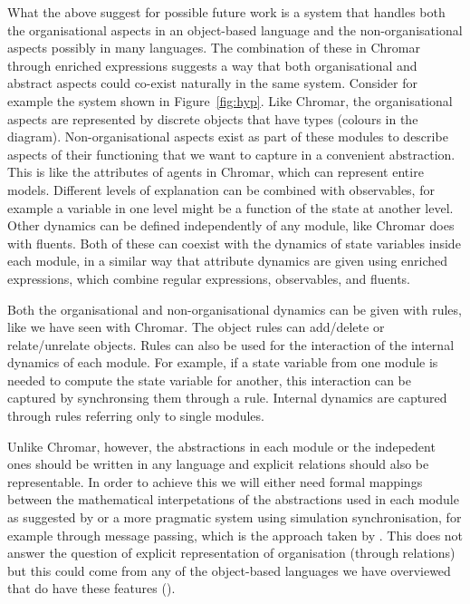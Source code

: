 What the above suggest for possible future work is a system that handles both
the organisational aspects in an object-based language and the
non-organisational aspects possibly in many languages. The combination of these
in Chromar through enriched expressions suggests a way that both organisational
and abstract aspects could co-exist naturally in the same system. Consider for
example the system shown in Figure~\ref{fig:hyp}. Like Chromar, the
organisational aspects are represented by discrete objects that have types
(colours in the diagram). Non-organisational aspects exist as part of these
modules to describe aspects of their functioning that we want to capture in a
convenient abstraction. This is like the attributes of agents in Chromar, which
can represent entire models. Different levels of explanation can be combined
with observables, for example a variable in one level might be a function of the
state at another level. Other dynamics can be defined independently of any module,
like Chromar does with fluents. Both of these can coexist with the dynamics of
state variables inside each module, in a similar way that attribute dynamics are
given using enriched expressions, which combine regular expressions,
observables, and fluents.

Both the organisational and non-organisational dynamics can be given with rules,
like we have seen with Chromar. The object rules can add/delete or
relate/unrelate objects. Rules can also be used for the interaction of the
internal dynamics of each module. For example, if a state variable from one
module is needed to compute the state variable for another, this interaction can
be captured by synchronsing them through a rule. Internal dynamics are captured
through rules referring only to single modules.

Unlike Chromar, however, the abstractions in each module or the indepedent ones
should be written in any language and explicit relations should also be
representable. In order to achieve this we will either need formal mappings
between the mathematical interpetations of the abstractions used in each module
as suggested by \citet{mjolsness_prospects_2018} or a more pragmatic system
using simulation synchronisation, for example through message passing, which is
the approach taken by \citet{cis_2018}. This does not answer the question of
explicit representation of organisation (through relations) but this could come
from any of the object-based languages we have overviewed that do have these
features ().

